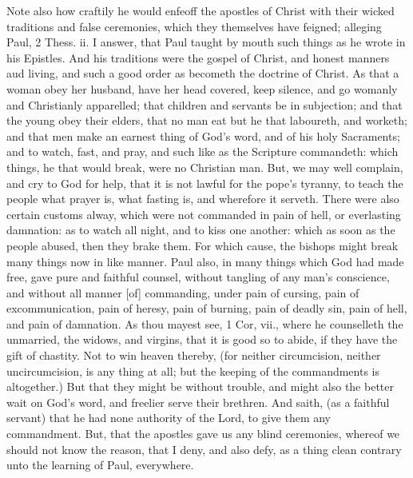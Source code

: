 Note also how craftily he would enfeoff the apostles of 
Christ with their wicked traditions and false ceremonies, 
which they themselves have feigned; alleging Paul, 
2 Thess. ii. I answer, that Paul taught by mouth such 
things as he wrote in his Epistles. And his traditions 
were the gospel of Christ, and honest manners aud living, 
and such a good order as becometh the doctrine of Christ. 
As that a woman obey her husband, have her head covered, 
keep silence, and go womanly and Christianly apparelled; 
that children and servants be in subjection; and that the 
young obey their elders, that no man eat but he that laboureth,
and worketh; and that men make an earnest 
thing of God's word, and of his holy Sacraments; and 
to watch, fast, and pray, and such like as the Scripture 
commandeth: which things, he that would break, were 
no Christian man. But, we may well complain, and 
cry to God for help, that it is not lawful for the pope's 
tyranny, to teach the people what prayer is, what fasting 
is, and wherefore it serveth. There were also certain 
customs alway, which were not commanded in pain of 
hell, or everlasting damnation: as to watch all night, 
and to kiss one another: which as soon as the people 
abused, then they brake them. For which cause, the 
bishops might break many things now in like manner. 
Paul also, in many things which God had made free, gave 
pure and faithful counsel, without tangling of any man's 
conscience, and without all manner [of] commanding, under 
pain of cursing, pain of excommunication, pain of heresy, 
pain of burning, pain of deadly sin, pain of hell, and 
pain of damnation. As thou mayest see, 1 Cor, vii., 
where he counselleth the unmarried, the widows, and virgins,
that it is good so to abide, if they have the gift of 
chastity. Not to win heaven thereby, (for neither circumcision,
neither uncircumcision, is any thing at all; but the 
keeping of the commandments is altogether.) But that 
they might be without trouble, and might also the better 
wait on God's word, and freelier serve their brethren. And 
saith, (as a faithful servant) that he had none authority of 
the Lord, to give them any commandment. But, that the 
apostles gave us any blind ceremonies, whereof we should 
not know the reason, that I deny, and also defy, as a 
thing clean contrary unto the learning of Paul, everywhere. 

